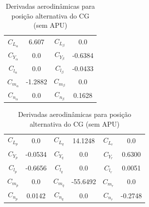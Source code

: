 \begin{table}[H]
\centering
\caption{Derivadas aerodinâmicas para posição alternativa do CG (sem APU)}
\begin{tabular}{cccc}
\toprule
$ C_{L_{\alpha}} $ &   6.607 & $ C_{L_{\beta}} $ &     0.0  \\ [0.3cm]
$ C_{Y_{\alpha}} $ &     0.0 & $ C_{Y_{\beta}} $ & -0.6384  \\ [0.3cm]
$ C_{l_{\alpha}} $ &     0.0 & $ C_{l_{\beta}} $ & -0.0433  \\ [0.3cm]
$ C_{m_{\alpha}} $ & -1.2882 & $ C_{m_{\beta}} $ &     0.0  \\ [0.3cm]
$ C_{n_{\alpha}} $ &     0.0 & $ C_{n_{\beta}} $ &  0.1628  \\ [0.3cm]
\bottomrule
\end{tabular}
\begin{tabular}{cccccc}
\toprule
$ C_{L_{p}} $ &     0.0 & $ C_{L_{q}} $ & 14.1248  & $ C_{L_{r}} $ &   0.0   \\ [0.3cm]
$ C_{Y_{p}} $ & -0.0534 & $ C_{Y_{q}} $ &    0.0  & $ C_{Y_{r}} $ & 0.6300  \\ [0.3cm]
$ C_{l_{p}} $ & -0.6656 & $ C_{l_{q}} $ &    0.0  & $ C_{l_{r}} $ & 0.0051 \\ [0.3cm]
$ C_{m_{p}} $ &     0.0 & $ C_{m_{q}} $ & -55.6492  & $ C_{m_{r}} $ &   0.0  \\ [0.3cm]
$ C_{n_{p}} $ &  0.0142 & $ C_{n_{q}} $ &    0.0  & $ C_{n_{r}} $ & -0.2748 \\ [0.3cm]
\bottomrule
\end{tabular}
\end{table}